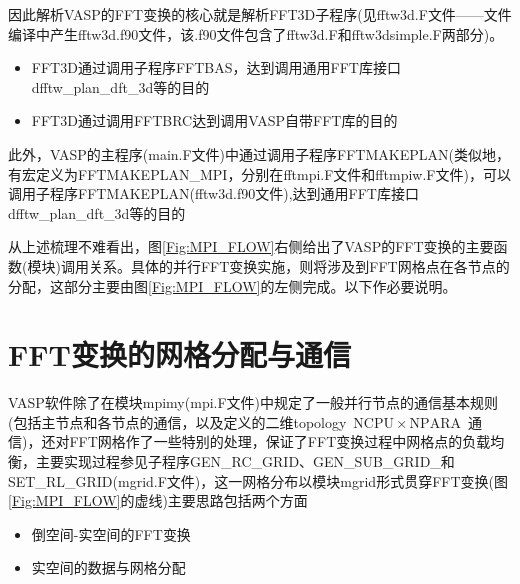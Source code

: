 因此解析\textrm{VASP}的\textrm{FFT}变换的核心就是解析\textrm{FFT3D}子程序(见\textrm{fftw3d.F}文件——文件编译中产生\textrm{fftw3d.f90}文件，该\textrm{.f90}文件包含了\textrm{fftw3d.F}和\textrm{fftw3dsimple.F}两部分)。

\begin{itemize}
	\item \textrm{FFT3D}通过调用子程序\textrm{FFTBAS}，达到调用通用\textrm{FFT}库接口\textrm{dfftw\_plan\_dft\_3d}等的目的
	\item \textrm{FFT3D}通过调用\textrm{FFTBRC}达到调用\textrm{VASP}自带\textrm{FFT}库的目的
\end{itemize}

此外，\textrm{VASP}的主程序(\textrm{main.F}文件)中通过调用子程序\textrm{FFTMAKEPLAN}(类似地，有宏定义为\textrm{FFTMAKEPLAN\_MPI}，分别在\textrm{fftmpi.F}文件和\textrm{fftmpiw.F}文件)，可以调用子程序\textrm{FFTMAKEPLAN}(\textrm{fftw3d.f90}文件),达到通用\textrm{FFT}库接口\textrm{dfftw\_plan\_dft\_3d}等的目的

从上述梳理不难看出，图\ref{Fig:MPI_FLOW}右侧给出了\textrm{VASP}的\textrm{FFT}变换的主要函数(模块)调用关系。具体的并行\textrm{FFT}变换实施，则将涉及到\textrm{FFT}网格点在各节点的分配，这部分主要由图\ref{Fig:MPI_FLOW}的左侧完成。以下作必要说明。

\section{\rm{FFT}变换的网格分配与通信}
\textrm{VASP}软件除了在模块\textrm{mpimy}(\textrm{mpi.F}文件)中规定了一般并行节点的通信基本规则(包括主节点和各节点的通信，以及定义的二维\textrm{topology}~$\mathrm{NCPU}\times\mathrm{NPARA}$~通信)，还对\textrm{FFT}网格作了一些特别的处理，保证了\textrm{FFT}变换过程中网格点的负载均衡，主要实现过程参见子程序\textrm{GEN\_RC\_GRID}、\textrm{GEN\_SUB\_GRID\_}和\textrm{SET\_RL\_GRID}(\textrm{mgrid.F}文件)，这一网格分布以模块\textrm{mgrid}形式贯穿\textrm{FFT}变换(图\ref{Fig:MPI_FLOW}的虚线)主要思路包括两个方面
\begin{itemize}
	\item 倒空间-实空间的\textrm{FFT}变换
	\item 实空间的数据与网格分配
\end{itemize}

